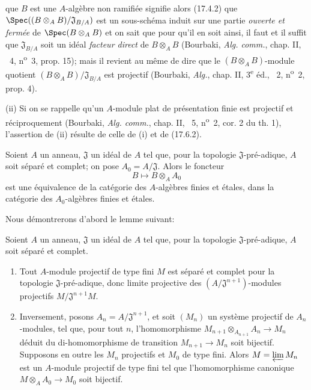 
que $B$ est une $A$-algèbre non ramifiée signifie alors (17.4.2) que $\Spec((B\otimes_A B)/\mathfrak J_{B/A})$ est un sous-schéma induit sur une partie \emph{ouverte et fermée} de $\Spec(B\otimes_A B)$ et on sait que pour qu'il en soit ainsi, il faut et il suffit que $\mathfrak J_{B/A}$ soit un idéal \emph{facteur direct} de $B\otimes_A B$ (Bourbaki, \emph{Alg. comm.}, chap. II, \textsection~4, n\textsuperscript{o}~3, prop. 15); mais il revient au même de dire que le $(B\otimes_A B)$-module quotient $(B\otimes_A B)/\mathfrak J_{B/A}$ est projectif (Bourbaki, \emph{Alg.}, chap. II, 3\textsuperscript{e} éd., \textsection~2, n\textsuperscript{o}~2, prop. 4).

(ii) Si on se rappelle qu'un $A$-module plat de présentation finie est projectif et réciproquement (Bourbaki, \emph{Alg. comm.}, chap. II, \textsection~5, n\textsuperscript{o}~2, cor. 2 du th. 1), l'assertion de (ii) résulte de celle de (i) et de (17.6.2).

\begin{proposition}[18.3.2]
\label{IV.18.3.2}
Soient $A$ un anneau, $\mathfrak J$ un idéal de $A$ tel que, pour la topologie $\mathfrak J$-pré-adique, $A$ soit séparé et complet; on pose $A_0=A/\mathfrak J$. Alors le foncteur
\[
  B\longmapsto B\otimes_A A_0
\]
est une équivalence de la catégorie des $A$-algèbres finies et étales, dans la catégorie des $A_0$-algèbres finies et étales.
\end{proposition}

Nous démontrerons d'abord le lemme suivant:

\begin{lemma}[18.3.2.1]
\label{IV.18.3.2.1}
Soient $A$ un anneau, $\mathfrak J$ un idéal de $A$ tel que, pour la topologie $\mathfrak J$-pré-adique, $A$ soit séparé et complet.
\begin{enumerate}
  \item[(i)] Tout $A$-module projectif de type fini $M$ est séparé et complet pour la topologie $\mathfrak J$-pré-adique, donc limite projective des $(A/\mathfrak J^{n+1})$-modules projectifs $M/\mathfrak J^{n+1}M$.
  \item[(ii)] Inversement, posons $A_n=A/\mathfrak J^{n+1}$, et soit $(M_n)$ un système projectif de $A_n$-modules, tel que, pour tout $n$, l'homomorphisme $M_{n+1}\otimes_{A_{n+1}}A_n\to M_n$ déduit du di-homomorphisme de transition $M_{n+1}\to M_n$ soit bijectif. Supposons en outre les $M_n$ projectifs et $M_0$ de type fini. Alors $M=\varprojlim M_n$ est un $A$-module projectif de type fini tel que l'homomorphisme canonique $M\otimes_A A_0\to M_0$ soit bijectif.
\end{enumerate}
\end{lemma}

